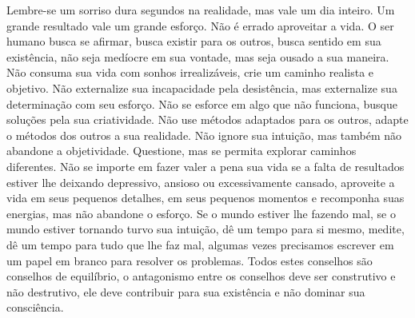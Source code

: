 Lembre-se um sorriso dura segundos na realidade, mas vale um dia inteiro. Um grande resultado vale um grande esforço. Não é errado aproveitar a vida. O ser humano busca se afirmar, busca existir para os outros, busca sentido em sua existência, não seja medíocre em sua vontade, mas seja ousado a sua maneira. Não consuma sua vida com sonhos irrealizáveis, crie um caminho realista e objetivo. Não externalize sua incapacidade pela desistência, mas externalize sua determinação com seu esforço. Não se esforce em algo que não funciona, busque soluções pela sua criatividade. Não use métodos adaptados para os outros, adapte o métodos dos outros a sua realidade. Não ignore sua intuição, mas também não abandone a objetividade. Questione, mas se permita explorar caminhos diferentes. Não se importe em fazer valer a pena sua vida se a falta de resultados estiver lhe deixando depressivo, ansioso ou excessivamente cansado, aproveite a vida em seus pequenos detalhes, em seus pequenos momentos e recomponha suas energias, mas não abandone o esforço. Se o mundo estiver lhe fazendo mal, se o mundo estiver tornando turvo sua intuição, dê um tempo para si mesmo, medite, dê um tempo para tudo que lhe faz mal, algumas vezes precisamos escrever em um papel em branco para resolver os problemas. Todos estes conselhos são conselhos de equilíbrio, o antagonismo entre os conselhos deve ser construtivo e não destrutivo, ele deve contribuir para sua existência e não dominar sua consciência. 

